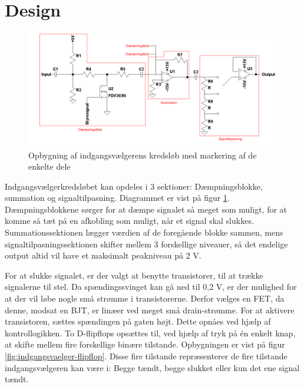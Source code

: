 \section{Design}

\begin{figure}[h]
\centering
\includegraphics[width=\textwidth]{teknisk/indgangsvaelger/signal-taend-sluk.png}
\caption{Opbygning af indgangsvælgerens kredsløb med markering af de enkelte dele}
\label{fig:indgangsvaelger-overordnet}
\end{figure}

Indgangsvælgerkredsløbet kan opdeles i 3 sektioner: Dæmpningsblokke, summation og signaltilpasning. Diagrammet er vist på figur \ref{fig:indgangsvaelger-overordnet}. Dæmpningsblokkene sørger for at dæmpe signalet så meget som muligt, for at komme så tæt på en afkobling som muligt, når et signal skal slukkes. Summationssektionen lægger værdien af de foregående blokke sammen, mens signaltilpasningssektionen skifter mellem 3 forskellige niveauer, så det endelige output altid vil have et maksimalt peakniveau på 2 V.  

For at slukke signalet, er der valgt at benytte transistorer, til at trække signalerne til stel. Da spændingssvinget kan gå ned til 0,2 V, er der mulighed for at der vil løbe nogle små strømme i transistorerne. Derfor vælges en FET, da denne, modsat en BJT, er linæer ved meget små drain-strømme. For at aktivere transistoren, sættes spændingen på gaten højt. Dette opnåes ved hjælp af kontrollogikken. To D-flipflops opsættes til, ved hjælp af tryk på én enkelt knap, at skifte mellem fire forskellige binære tilstande. Opbygningen er vist på figur \ref{fig:indgangsvaelger-flipflop}. Disse fire tilstande repræsenterer de fire tilstande indgangsvælgeren kan være i: Begge tændt, begge slukket eller kun det ene signal tændt.

